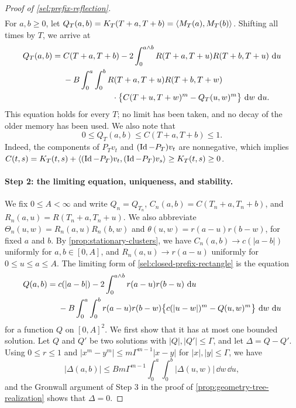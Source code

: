 \begin{proof}[Proof of \cref{sel:prefix-reflection}]
\[\begin{aligned}
\end{aligned}
\]
For $a,b\ge0$, let $Q_T(a,b)=K_T(T+a,T+b)=\left\langle M_T(a),M_T(b)\right\rangle$. Shifting all times by $T$, we arrive at
\begin{align}
 Q_T(a,b)={}&C(T+a,T+b)
 -2\int_0^{a\wedge b}R(T+a,T+u)R(T+b,T+u)\,\mathop{}\!\mathrm d u
 \notag\\
 &-B\int_0^a\int_0^b R(T+a,T+u)R(T+b,T+w)
 \notag\\
 &\hspace{6em}\cdot\bigl\{C(T+u,T+w)^m-Q_T(u,w)^m\bigr\}\,\mathop{}\!\mathrm d w\,\mathop{}\!\mathrm d u.
 \label{sel:closed-prefix-rectangle}
\end{align}
This equation holds for every $T$; no limit has been taken, and no decay of the older memory has been used. We also note that
\[
 0\le Q_T(a,b)\le C(T+a,T+b)\le1.
\]
Indeed, the components of $P_Tv_t$ and $(\operatorname{Id}-P_T)v_t$ are nonnegative, which implies $C(t,s)=K_T(t,s)+\left\langle(\operatorname{Id}-P_T)v_t,(\operatorname{Id}-P_T)v_s\right\rangle\ge K_T(t,s)\ge0$.

\paragraph{Step 2: the limiting equation, uniqueness, and stability.}
We fix $0\le A<\infty$ and write $Q_n=Q_{T_n}$, $C_n(a,b)=C(T_n+a,T_n+b)$, and $R_n(a,u)=R(T_n+a,T_n+u)$. We also abbreviate $\Theta_n(u,w)=R_n(a,u)R_n(b,w)$ and $\theta(u,w)=r(a-u)r(b-w)$, for fixed $a$ and $b$. By \cref{prop:stationary-clusters}, we have $C_n(a,b)\to c(|a-b|)$ uniformly for $a,b\in[0,A]$, and $R_n(a,u)\to r(a-u)$ uniformly for $0\le u\le a\le A$. The limiting form of \eqref{sel:closed-prefix-rectangle} is the equation
\begin{align}
 Q(a,b)={}&c(|a-b|)-2\int_0^{a\wedge b}r(a-u)r(b-u)\,\mathop{}\!\mathrm d u
 \notag\\
 &-B\int_0^a\int_0^b r(a-u)r(b-w)\bigl\{c(|u-w|)^m-Q(u,w)^m\bigr\}\,\mathop{}\!\mathrm d w\,\mathop{}\!\mathrm d u
 \label{sel:limiting-prefix-rectangle}
\end{align}
for a function $Q$ on $[0,A]^2$. We first show that it has at most one bounded solution. Let $Q$ and $Q'$ be two solutions with $|Q|,|Q'|\le\Gamma$, and let $\Delta=Q-Q'$. Using $0\le r\le1$ and $|x^m-y^m|\le m\Gamma^{m-1}|x-y|$ for $|x|,|y|\le\Gamma$, we have
\[
 |\Delta(a,b)|\le Bm\Gamma^{m-1}\int_0^a\int_0^b|\Delta(u,w)|\,\dd w\,\dd u,
\]
and the Gronwall argument of Step 3 in the proof of \cref{prop:geometry-tree-realization} shows that $\Delta=0$.


\end{proof}
